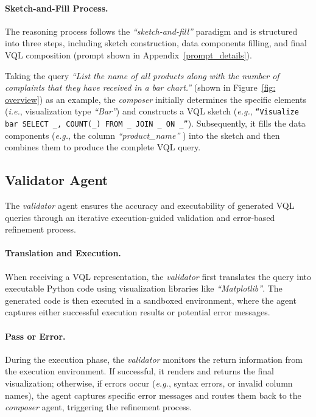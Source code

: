 \paragraph{Sketch-and-Fill Process.}
The reasoning process follows the \textit{``sketch-and-fill''} paradigm and is structured into three steps, including sketch construction, data components filling, and final VQL composition (prompt shown in Appendix~\ref{prompt_details}).

Taking the query \textit{``List the name of all products along with the number of complaints that they have received in a bar chart.''} (shown in Figure~\ref{fig: overview}) as an example, the \textit{composer} initially determines the specific elements (\emph{i.e.}, visualization type \textit{``Bar''}) and constructs a VQL sketch (\emph{e.g.}, \texttt{``Visualize bar SELECT \_, COUNT(\_) FROM \_ JOIN \_ ON \_''}). Subsequently, it fills the data components (\emph{e.g.}, the column \textit{``product\_name''} ) into the sketch and then combines them to produce the complete VQL query.




\subsection{Validator Agent} 
\label{validator}

The \textit{validator} agent ensures the accuracy and executability of generated VQL queries through an iterative execution-guided validation and error-based refinement process.

\paragraph{Translation and Execution.} 
When receiving a VQL representation, the \textit{validator} first translates the query into executable Python code using visualization libraries like \textit{``Matplotlib''}. The generated code is then executed in a sandboxed environment, where the agent captures either successful execution results or potential error messages.

\paragraph{Pass or Error.} During the execution phase, the \textit{validator} monitors the return information from the execution environment. If successful, it renders and returns the final visualization; otherwise, if errors occur (\emph{e.g.}, syntax errors, or invalid column names), the agent captures specific error messages and routes them back to the \textit{composer} agent, triggering the refinement process.


